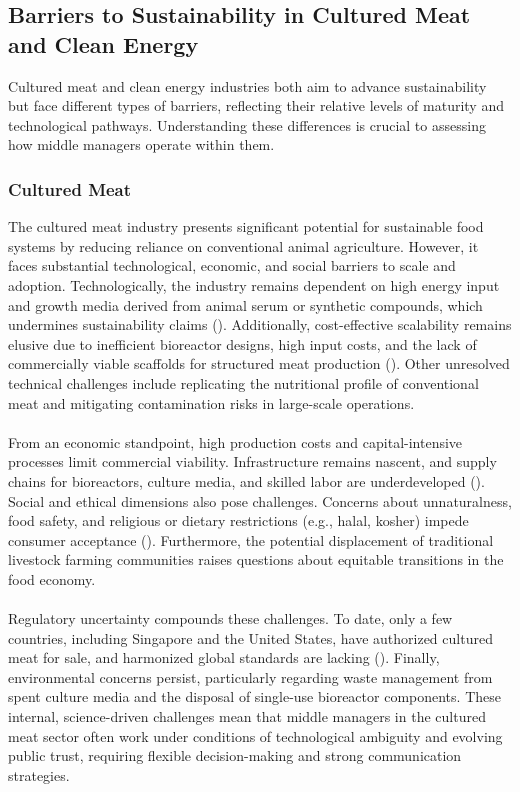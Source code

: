 	\subsection{Barriers to Sustainability in Cultured Meat and Clean Energy}
	Cultured meat and clean energy industries both aim to advance sustainability but face different types of barriers, reflecting their relative levels of maturity and technological pathways. Understanding these differences is crucial to assessing how middle managers operate within them.
	
	\subsubsection{Cultured Meat}
	The cultured meat industry presents significant potential for sustainable food systems by reducing reliance on conventional animal agriculture. However, it faces substantial technological, economic, and social barriers to scale and adoption. Technologically, the industry remains dependent on high energy input and growth media derived from animal serum or synthetic compounds, which undermines sustainability claims (\textcite{Specht2023, Post2020}). Additionally, cost-effective scalability remains elusive due to inefficient bioreactor designs, high input costs, and the lack of commercially viable scaffolds for structured meat production (\textcite{Bodiou2020}). Other unresolved technical challenges include replicating the nutritional profile of conventional meat and mitigating contamination risks in large-scale operations.
	
	\paragraph*{} From an economic standpoint, high production costs and capital-intensive processes limit commercial viability. Infrastructure remains nascent, and supply chains for bioreactors, culture media, and skilled labor are underdeveloped (\textcite{Stephens2018}). Social and ethical dimensions also pose challenges. Concerns about unnaturalness, food safety, and religious or dietary restrictions (e.g., halal, kosher) impede consumer acceptance (\textcite{Bryant2020}). Furthermore, the potential displacement of traditional livestock farming communities raises questions about equitable transitions in the food economy.
	
	\paragraph*{} Regulatory uncertainty compounds these challenges. To date, only a few countries, including Singapore and the United States, have authorized cultured meat for sale, and harmonized global standards are lacking (\textcite{SFA2020, FDA2023}). Finally, environmental concerns persist, particularly regarding waste management from spent culture media and the disposal of single-use bioreactor components. These internal, science-driven challenges mean that middle managers in the cultured meat sector often work under conditions of technological ambiguity and evolving public trust, requiring flexible decision-making and strong communication strategies.
	
